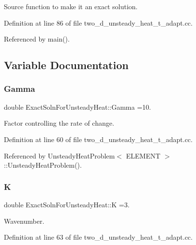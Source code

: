 Source function to make it an exact solution. 



Definition at line 86 of file two\+\_\+d\+\_\+unsteady\+\_\+heat\+\_\+t\+\_\+adapt.\+cc.



Referenced by main().



\subsection{Variable Documentation}
\mbox{\label{namespaceExactSolnForUnsteadyHeat_a188d3472da738e31efb23740c027754c}} 
\subsubsection{\texorpdfstring{Gamma}{Gamma}}
{\footnotesize\ttfamily double Exact\+Soln\+For\+Unsteady\+Heat\+::\+Gamma =10.}



Factor controlling the rate of change. 



Definition at line 60 of file two\+\_\+d\+\_\+unsteady\+\_\+heat\+\_\+t\+\_\+adapt.\+cc.



Referenced by Unsteady\+Heat\+Problem$<$ E\+L\+E\+M\+E\+N\+T $>$\+::\+Unsteady\+Heat\+Problem().

\mbox{\label{namespaceExactSolnForUnsteadyHeat_a20d04bcf14546becd4bcdf45446be756}} 
\subsubsection{\texorpdfstring{K}{K}}
{\footnotesize\ttfamily double Exact\+Soln\+For\+Unsteady\+Heat\+::K =3.}



Wavenumber. 



Definition at line 63 of file two\+\_\+d\+\_\+unsteady\+\_\+heat\+\_\+t\+\_\+adapt.\+cc.




